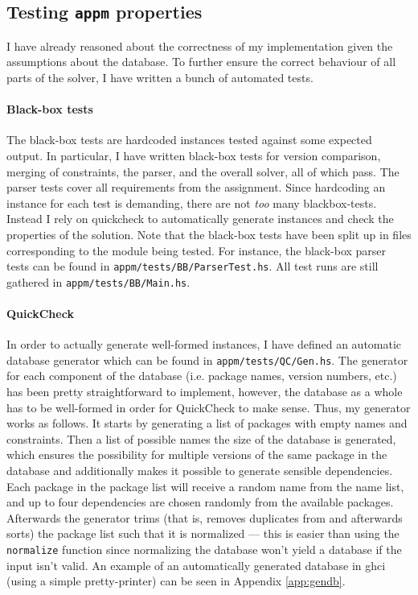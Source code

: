 \subsection*{Testing \texttt{appm} properties}
I have already reasoned about the correctness of my implementation given the assumptions about the database. To further ensure the correct behaviour of all parts of the solver, I have written a bunch of automated tests.

\paragraph{Black-box tests}
The black-box tests are hardcoded instances tested against some expected output. In particular, I have written black-box tests for version comparison, merging of constraints, the parser, and the overall solver, all of which pass. The parser tests cover all requirements from the assignment. Since hardcoding an instance for each test is demanding, there are not \textit{too} many blackbox-tests. Instead I rely on quickcheck to automatically generate instances and check the properties of the solution. Note that the black-box tests have been split up in files corresponding to the module being tested. For instance, the black-box parser tests can be found in \texttt{appm/tests/BB/ParserTest.hs}. All test runs are still gathered in \texttt{appm/tests/BB/Main.hs}.

\paragraph{QuickCheck}
In order to actually generate well-formed instances, I have defined an automatic database generator which can be found in \texttt{appm/tests/QC/Gen.hs}. The generator for each component of the database (i.e. package names, version numbers, etc.) has been pretty straightforward to implement, however, the database as a whole has to be well-formed in order for QuickCheck to make sense. Thus, my generator works as follows. It starts by generating a list of packages with empty names and constraints. Then a list of possible names the size of the database is generated, which ensures the possibility for multiple versions of the same package in the database and additionally makes it possible to generate sensible dependencies. Each package in the package list will receive a random name from the name list, and up to four dependencies are chosen randomly from the available packages. Afterwards the generator trims (that is, removes duplicates from and afterwards sorts) the package list such that it is normalized --- this is easier than using the \texttt{normalize} function since normalizing the database won't yield a database if the input isn't valid. An example of an automatically generated database in ghci (using a simple pretty-printer) can be seen in Appendix \ref{app:gendb}. \\

